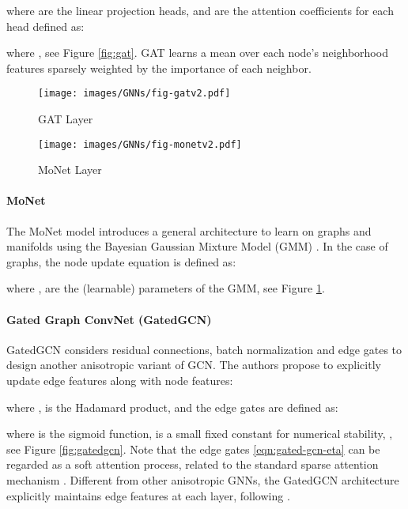 \documentclass{article}
\begin{document}
where  are the  linear projection heads, and  are the attention coefficients for each head defined as:


where , see Figure \ref{fig:gat}. GAT learns a mean over each node's neighborhood features sparsely weighted by the importance of each neighbor. 







\begin{figure}[t!]
\centering
\begin{minipage}{.5\textwidth}
\centering
\texttt{[image: images/GNNs/fig-gatv2.pdf]}
\caption{GAT Layer}
  \label{fig:gat}
\end{minipage}\begin{minipage}{.5\textwidth}
\centering
\texttt{[image: images/GNNs/fig-monetv2.pdf]}
\caption{MoNet Layer}
  \label{fig:monet}
\end{minipage}\end{figure}








\paragraph{MoNet \cite{Monti_2017}} The MoNet model introduces a general architecture to learn on graphs and manifolds using the Bayesian Gaussian Mixture Model (GMM) \cite{dempster1977maximum}. In the case of graphs, the node update equation is defined as:

where ,  are the (learnable) parameters of the GMM, see Figure \ref{fig:monet}.





\paragraph{Gated Graph ConvNet (GatedGCN) \cite{bresson2017residual}}

GatedGCN considers residual connections, batch normalization and edge gates to design another anisotropic variant of GCN. The authors propose to explicitly update edge features along with node features:  

where ,  is the Hadamard product, and the edge gates  are defined as:

where  is the sigmoid function,  is a small fixed constant for numerical stability, , see Figure \ref{fig:gatedgcn}. 
Note that the edge gates \eqref{eqn:gated-gcn-eta} can be regarded as a soft attention process, related to the standard sparse attention mechanism \cite{bahdanau2014neural}.
Different from other anisotropic GNNs, the GatedGCN architecture explicitly maintains edge features  at each layer, following \cite{bresson2019two,joshi2019efficient}.
\end{document}
